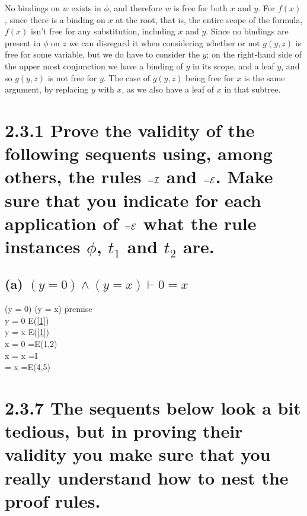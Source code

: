 \documentclass[11pt,a4paper]{article}
\def\intro#1{{#1}{\cal I}}
\def\elim#1{{#1}{\cal E}}
\def\elim#1{{{#1}{\cal E}}}
\def\intro#1{{{#1}{\cal I}}}
\begin{document}
No bindings on $w$ exists in $\phi$, and therefore $w$ is free for both $x$
and $y$. For $f(x)$, since there is a binding on $x$ at the root, that is, the
entire scope of the formula, $f(x)$ isn't free for any substitution, including
$x$ and $y$. Since no bindings are present in $\phi$ on $z$ we can disregard
it when considering whether or not $g(y,z)$ is free for some variable, but we
do have to consider the $y$; on the right-hand side of the upper most
conjunction we have a binding of $y$ in its scope, and a leaf $y$, and so
$g(y,z)$ is not free for $y$. The case of $g(y,z)$ being free for $x$ is the
same argument, by replacing $y$ with $x$, as we also have a leaf of $x$ in
that subtree.


\newpage
\section*{2.3.1 \mdseries Prove the validity of the following sequents using,
among others, the rules $\intro=$ and $\elim=$. Make sure that you indicate
for each application of $\elim=$ what the rule instances $\phi$, $t_1$ and
$t_2$ are.}

\subsection*{(a) \mdseries $(y = 0) \land (y = x) \vdash 0 = x$}
\begin{proofbox}
		\: (y = 0) \land (y = x)			\=\mbox{premise} \\
		\: y = 0							\=\elim\land(\ref{1}) \\
		\: y = x							\=\elim\land(\ref{1}) \\
		\: x = 0							\=\elim=(1,2) \\
		\: x = x							\=\intro= \\
		 = x							\=\elim=(4,5) \\
\end{proofbox}

\section*{2.3.7 \mdseries The sequents below look a bit tedious, but in
proving their validity you make sure that you really understand how to nest
the proof rules.}
\end{document}
